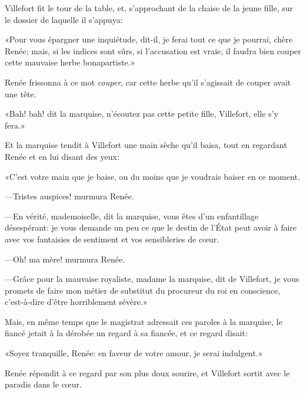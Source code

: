 Villefort fit le tour de la table, et, s'approchant de la chaise de la jeune fille, sur le dossier de laquelle il s'appuya:

«Pour vous épargner une inquiétude, dit-il, je ferai tout ce que je pourrai, chère Renée; mais, si les indices sont sûrs, si l'accusation est vraie, il faudra bien couper cette mauvaise herbe bonapartiste.»

Renée frissonna à ce mot \textit{couper}, car cette herbe qu'il s'agissait de couper avait une tête.

«Bah! bah! dit la marquise, n'écoutez pas cette petite fille, Villefort, elle s'y fera.»

Et la marquise tendit à Villefort une main sèche qu'il baisa, tout en regardant Renée et en lui disant des yeux:

«C'est votre main que je baise, ou du moins que je voudrais baiser en ce moment.

—Tristes auspices! murmura Renée.

—En vérité, mademoiselle, dit la marquise, vous êtes d'un enfantillage désespérant: je vous demande un peu ce que le destin de l'État peut avoir à faire avec vos fantaisies de sentiment et vos sensibleries de cœur.

—Oh! ma mère! murmura Renée.

—Grâce pour la mauvaise royaliste, madame la marquise, dit de Villefort, je vous promets de faire mon métier de substitut du procureur du roi en conscience, c'est-à-dire d'être horriblement sévère.»

Mais, en même temps que le magistrat adressait ces paroles à la marquise, le fiancé jetait à la dérobée un regard à sa fiancée, et ce regard disait:

«Soyez tranquille, Renée: en faveur de votre amour, je serai indulgent.»

Renée répondit à ce regard par son plus doux sourire, et Villefort sortit avec le paradis dans le cœur.



